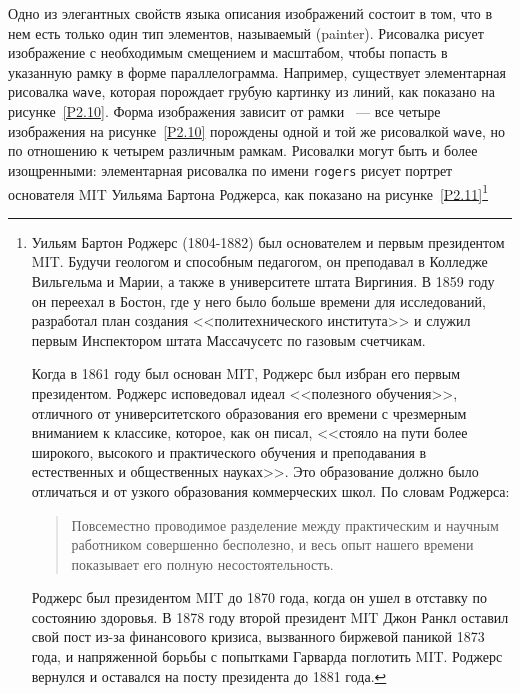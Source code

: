 Одно из элегантных свойств языка описания изображений
состоит в том, что в нем есть только один тип элементов, называемый
 (painter).  Рисовалка рисует
изображение с необходимым смещением и масштабом, чтобы попасть в
указанную 
рамку в форме
параллелограмма.  Например, существует
элементарная рисовалка {\tt wave}, которая порождает грубую
картинку из линий, как показано на рисунке~\ref{P2.10}.
Форма изображения зависит от рамки ~--- все четыре изображения на
рисунке~\ref{P2.10} порождены одной и той же рисовалкой
{\tt wave}, но по отношению к четырем различным рамкам.
Рисовалки могут быть и более изощренными: элементарная рисовалка по
имени {\tt rogers} рисует портрет основателя MIT  Уильяма Бартона
Роджерса, как показано на рисунке~\ref{P2.11}\footnote{
  Уильям Бартон
  Роджерс 
  (1804-1882) был основателем и первым
  президентом MIT.  Будучи геологом и способным педагогом, он преподавал 
  в Колледже Вильгельма и Марии, а также в университете штата Виргиния. В
  1859 году он переехал в Бостон, где у него было больше времени для
  исследований, разработал план создания <<политехнического института>>
  и служил первым Инспектором штата Массачусетс по газовым
  счетчикам.

  Когда в 1861 году был основан MIT, Роджерс был избран 
  его первым президентом.  Роджерс исповедовал идеал <<полезного
  обучения>>, отличного от университетского образования его времени с
  чрезмерным вниманием к классике, которое, как он писал, <<стояло
  на пути более широкого, высокого и практического обучения и
  преподавания в естественных и общественных науках>>. Это образование
  должно было отличаться и от узкого образования коммерческих школ. По
  словам Роджерса:

  \begin{quote}
    Повсеместно проводимое разделение между практическим
    и научным работником совершенно бесполезно, и весь опыт нашего
    времени показывает его полную несостоятельность.
  \end{quote}

  Роджерс был президентом MIT до 1870 года, когда он
  ушел в отставку по состоянию здоровья.  В 1878 году второй президент
  MIT Джон Ранкл
  оставил свой пост из-за финансового кризиса, 
  вызванного биржевой паникой 1873 года, и напряженной борьбы с попытками 
  Гарварда поглотить MIT.  Роджерс вернулся и оставался на посту
  президента до 1881 года.

}
